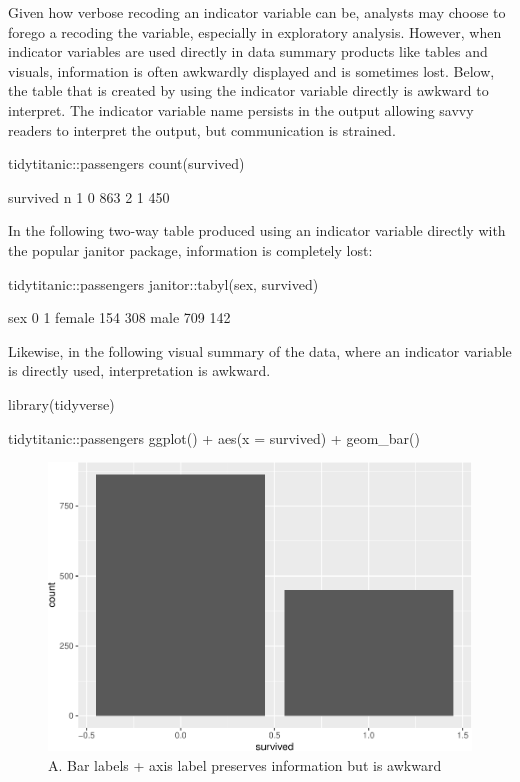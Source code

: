 Given how verbose recoding an indicator variable can be, analysts may
choose to forego a recoding the variable, especially in exploratory
analysis. However, when indicator variables are used directly in data
summary products like tables and visuals, information is often awkwardly
displayed and is sometimes lost. Below, the table that is created by
using the indicator variable directly is awkward to interpret. The
indicator variable name persists in the output allowing savvy readers to
interpret the output, but communication is strained.

\begin{Schunk}
\begin{Sinput}
tidytitanic::passengers %
  count(survived) 
\end{Sinput}
\begin{Soutput}
       survived   n
     1        0 863
     2        1 450
\end{Soutput}
\end{Schunk}

In the following two-way table produced using an indicator variable
directly with the popular janitor package, information is completely
lost:

\begin{Schunk}
\begin{Sinput}
tidytitanic::passengers %
  janitor::tabyl(sex, survived)
\end{Sinput}
\begin{Soutput}
         sex   0   1
      female 154 308
        male 709 142
\end{Soutput}
\end{Schunk}

Likewise, in the following visual summary of the data, where an
indicator variable is directly used, interpretation is awkward.

\begin{Schunk}
\begin{Sinput}
library(tidyverse)

tidytitanic::passengers %
  ggplot() + 
  aes(x = survived) + 
  geom_bar()
\end{Sinput}
\begin{figure}
\includegraphics[width=0.69\linewidth]{r_journal_files/figure-latex/direct_visual_awkward-1} \caption[A]{A. Bar labels + axis label preserves information but is awkward}\label{fig:direct_visual_awkward}
\end{figure}
\end{Schunk}

